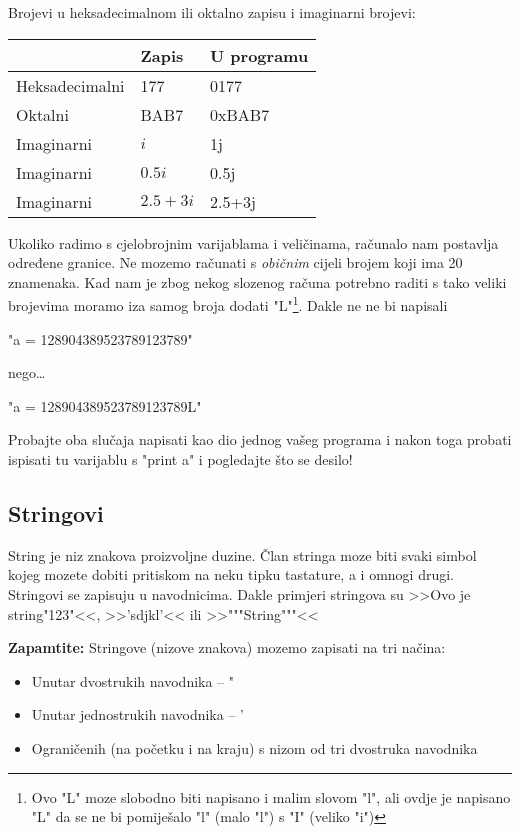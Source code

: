 	Brojevi u heksadecimalnom ili oktalno zapisu i imaginarni brojevi:

	\vspace{3mm}
	\begin{tabular}{l|l|l}
		& Zapis & U programu \\	
		\hline
		Heksadecimalni & 177 & 0177 \\
		\hline
		Oktalni & BAB7& 0xBAB7 \\
		\hline
		Imaginarni & $i$ & 1j \\
		\hline 
		Imaginarni & $0.5i$ & 0.5j \\
		\hline 
		Imaginarni & $2.5+3i$ & 2.5+3j \\
	\end{tabular}
	\vspace{3mm}

	Ukoliko radimo s cjelobrojnim varijablama i veličinama, računalo nam
	postavlja određene granice. Ne mozemo računati s \emph{običnim}
	cijeli brojem koji ima 20 znamenaka. Kad nam je zbog nekog slozenog računa
	potrebno raditi s tako veliki brojevima moramo iza samog broja dodati "L"\footnote{Ovo
	"L" moze slobodno biti napisano i malim slovom "l", ali ovdje je napisano "L"
	da se ne bi pomiješalo "l" (malo "l") s "I" (veliko "i")}. Dakle ne
	ne bi napisali 
	
	"a = 128904389523789123789"

	nego\dots

	"a = 128904389523789123789L"

	Probajte oba slučaja napisati kao dio jednog vašeg programa i nakon toga
	probati ispisati tu varijablu s "print a" i pogledajte što se desilo!

\subsection{Stringovi}

	String je niz znakova proizvoljne duzine. Član stringa moze biti svaki
	simbol kojeg mozete dobiti pritiskom na neku tipku tastature, a i omnogi drugi.
	Stringovi se zapisuju u navodnicima. Dakle primjeri stringova su 
	>>Ovo je string"123"<<, >>'sdjkl'<< ili >>"""String"""<<

\textbf{Zapamtite:} Stringove (nizove znakova) mozemo zapisati
na tri načina: 

	\begin{itemize}
		\item Unutar dvostrukih navodnika -- " 
		\item Unutar jednostrukih navodnika -- '
		\item Ograničenih (na početku i na kraju) s nizom od tri dvostruka
			navodnika
	\end{itemize}

